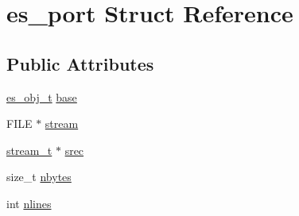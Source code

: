 \hypertarget{structes__port}{\section{es\-\_\-port Struct Reference}
\label{structes__port}
}
\subsection*{Public Attributes}
\begin{DoxyCompactItemize}
\item 
\hyperlink{eva_8h_a3370a89a85f5ff467ca5e7dba47e63bc}{es\-\_\-obj\-\_\-t} \hyperlink{structes__port_a4c95c5991712ac0400ceabe049f48573}{base}
\item 
F\-I\-L\-E $\ast$ \hyperlink{structes__port_a57fac42faee92a8575431edbc517f657}{stream}
\item 
\hyperlink{eva_8c_aa1f49f637a7bd758e258151ea80f58f7}{stream\-\_\-t} $\ast$ \hyperlink{structes__port_acb31875335022ea1c48b3fe399120d06}{srec}
\item 
size\-\_\-t \hyperlink{structes__port_a283806721ce2690cc685ff2bafaebf9c}{nbytes}
\item 
int \hyperlink{structes__port_a80c87ed8392c758c5828ae04f9e2d4d6}{nlines}
\end{DoxyCompactItemize}


